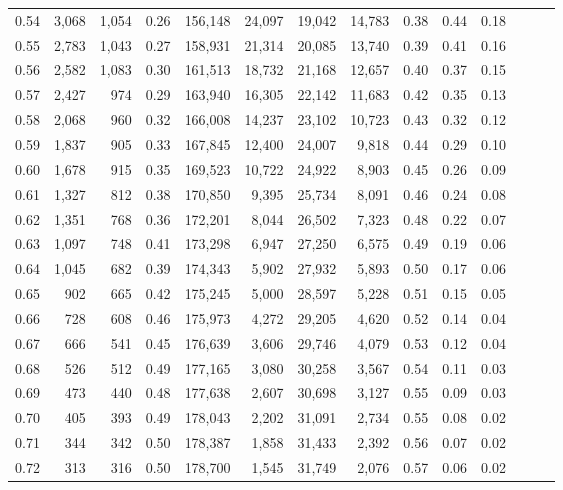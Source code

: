 \begin{tabular}{rrrrrrrrrrrrrr}
0.54 &  3,068 &  1,054 &  0.26 &  156,148 &   24,097 &  19,042 &  14,783 &  0.38 &  0.44 &      0.18 \\
0.55 &  2,783 &  1,043 &  0.27 &  158,931 &   21,314 &  20,085 &  13,740 &  0.39 &  0.41 &      0.16 \\
0.56 &  2,582 &  1,083 &  0.30 &  161,513 &   18,732 &  21,168 &  12,657 &  0.40 &  0.37 &      0.15 \\
0.57 &  2,427 &    974 &  0.29 &  163,940 &   16,305 &  22,142 &  11,683 &  0.42 &  0.35 &      0.13 \\
0.58 &  2,068 &    960 &  0.32 &  166,008 &   14,237 &  23,102 &  10,723 &  0.43 &  0.32 &      0.12 \\
0.59 &  1,837 &    905 &  0.33 &  167,845 &   12,400 &  24,007 &   9,818 &  0.44 &  0.29 &      0.10 \\
0.60 &  1,678 &    915 &  0.35 &  169,523 &   10,722 &  24,922 &   8,903 &  0.45 &  0.26 &      0.09 \\
0.61 &  1,327 &    812 &  0.38 &  170,850 &    9,395 &  25,734 &   8,091 &  0.46 &  0.24 &      0.08 \\
0.62 &  1,351 &    768 &  0.36 &  172,201 &    8,044 &  26,502 &   7,323 &  0.48 &  0.22 &      0.07 \\
0.63 &  1,097 &    748 &  0.41 &  173,298 &    6,947 &  27,250 &   6,575 &  0.49 &  0.19 &      0.06 \\
0.64 &  1,045 &    682 &  0.39 &  174,343 &    5,902 &  27,932 &   5,893 &  0.50 &  0.17 &      0.06 \\
0.65 &    902 &    665 &  0.42 &  175,245 &    5,000 &  28,597 &   5,228 &  0.51 &  0.15 &      0.05 \\
0.66 &    728 &    608 &  0.46 &  175,973 &    4,272 &  29,205 &   4,620 &  0.52 &  0.14 &      0.04 \\
0.67 &    666 &    541 &  0.45 &  176,639 &    3,606 &  29,746 &   4,079 &  0.53 &  0.12 &      0.04 \\
0.68 &    526 &    512 &  0.49 &  177,165 &    3,080 &  30,258 &   3,567 &  0.54 &  0.11 &      0.03 \\
0.69 &    473 &    440 &  0.48 &  177,638 &    2,607 &  30,698 &   3,127 &  0.55 &  0.09 &      0.03 \\
0.70 &    405 &    393 &  0.49 &  178,043 &    2,202 &  31,091 &   2,734 &  0.55 &  0.08 &      0.02 \\
0.71 &    344 &    342 &  0.50 &  178,387 &    1,858 &  31,433 &   2,392 &  0.56 &  0.07 &      0.02 \\
0.72 &    313 &    316 &  0.50 &  178,700 &    1,545 &  31,749 &   2,076 &  0.57 &  0.06 &      0.02 \\

\end{tabular}

